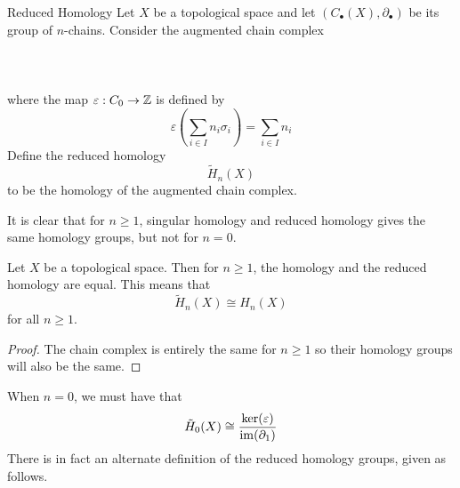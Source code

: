 \documentclass[a4paper]{article}
\begin{document}
\begin{defn}{Reduced Homology}{} Let $X$ be a topological space and let $(C_\bullet(X),\partial_\bullet)$ be its group of $n$-chains. Consider the augmented chain complex \\~\\
\\~\\
where the map $\varepsilon:C_0\to\mathbb{Z}$ is defined by $$\varepsilon\left(\sum_{i\in I}n_i\sigma_i\right)=\sum_{i\in I}n_i$$ Define the reduced homology $$\widetilde{H}_n(X)$$ to be the homology of the augmented chain complex. 
\end{defn}

It is clear that for $n\geq 1$, singular homology and reduced homology gives the same homology groups, but not for $n=0$. 

\begin{lmm}{}{} Let $X$ be a topological space. Then for $n\geq 1$, the homology and the reduced homology are equal. This means that $$\widetilde{H}_n(X)\cong H_n(X)$$ for all $n\geq 1$. \tcbline
\begin{proof}
The chain complex is entirely the same for $n\geq 1$ so their homology groups will also be the same. 
\end{proof}
\end{lmm}

When $n=0$, we must have that $$\tilde{H}_0(X)\cong\frac{\ker(\varepsilon)}{\operatorname{im}(\partial_1)}$$ There is in fact an alternate definition of the reduced homology groups, given as follows. 
\end{document}
